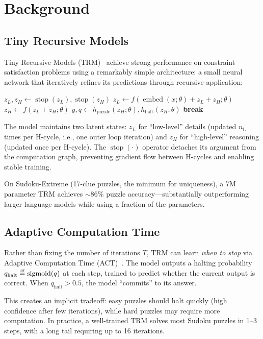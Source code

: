 \section{Background}

\subsection{Tiny Recursive Models}

Tiny Recursive Models (TRM)~\citep{jolicoeur2025trm} achieve strong performance
on constraint satisfaction problems using a remarkably simple architecture: a
small neural network that iteratively refines its predictions through recursive
application:
%
\begin{algorithm}[h]
\caption{TRM with ACT (Inference)}
\label{alg:trm}
\begin{algorithmic}[1]
      \STATE $z_L, z_H \gets \operatorname{stop}(z_L), \operatorname{stop}(z_H)$
        \STATE $z_L \gets f(\operatorname{embed}(x;\theta) + z_L + z_H;\theta)$
      \ENDFOR
      \STATE $z_H \gets f(z_L + z_H;\theta)$
    \ENDFOR
    \STATE $y,q \gets h_\text{puzzle}(z_H;\theta), h_\text{halt}(z_H;\theta)$
      \STATE \textbf{break}
    \ENDIF
  \ENDFOR
\end{algorithmic}
\end{algorithm}
%
The model maintains two latent states: $z_L$ for ``low-level'' details (updated
$n_\text{L}$ times per H-cycle, i.e., one outer loop iteration) and $z_H$ for
``high-level'' reasoning (updated once per H-cycle). The $\operatorname{stop}(\cdot)$ operator detaches
its argument from the computation graph, preventing gradient flow between
H-cycles and enabling stable training.

On Sudoku-Extreme (17-clue puzzles, the minimum for uniqueness), a 7M parameter
TRM achieves ${\sim}$86\% puzzle accuracy---substantially outperforming larger
language models while using a fraction of the parameters.

\subsection{Adaptive Computation Time}

Rather than fixing the number of iterations $T$, TRM can learn \emph{when to
stop} via Adaptive Computation Time (ACT)~\citep{graves2016act}. The model
outputs a halting probability $q_\text{halt}\defeq\sigmoid(q)$ at each step,
trained to predict whether the current output is correct. When $q_\text{halt} >
0.5$, the model ``commits'' to its answer.

This creates an implicit tradeoff: easy puzzles should halt quickly (high
confidence after few iterations), while hard puzzles may require more
computation. In practice, a well-trained TRM solves most Sudoku puzzles in 1--3
steps, with a long tail requiring up to 16 iterations.
